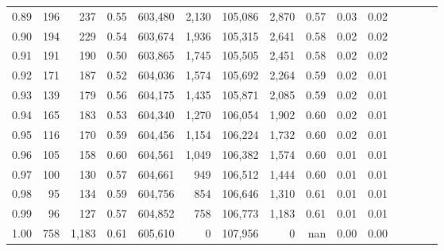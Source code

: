 \begin{tabular}{rrrcrrrrrrrrrrr}
0.89 &     196 &    237 &                                       0.55 &  603,480 &    2,130 &  105,086 &    2,870 &  0.57 &  0.03 &                         0.02 \\
0.90 &     194 &    229 &                                       0.54 &  603,674 &    1,936 &  105,315 &    2,641 &  0.58 &  0.02 &                         0.02 \\
0.91 &     191 &    190 &                                       0.50 &  603,865 &    1,745 &  105,505 &    2,451 &  0.58 &  0.02 &                         0.02 \\
0.92 &     171 &    187 &                                       0.52 &  604,036 &    1,574 &  105,692 &    2,264 &  0.59 &  0.02 &                         0.01 \\
0.93 &     139 &    179 &                                       0.56 &  604,175 &    1,435 &  105,871 &    2,085 &  0.59 &  0.02 &                         0.01 \\
0.94 &     165 &    183 &                                       0.53 &  604,340 &    1,270 &  106,054 &    1,902 &  0.60 &  0.02 &                         0.01 \\
0.95 &     116 &    170 &                                       0.59 &  604,456 &    1,154 &  106,224 &    1,732 &  0.60 &  0.02 &                         0.01 \\
0.96 &     105 &    158 &                                       0.60 &  604,561 &    1,049 &  106,382 &    1,574 &  0.60 &  0.01 &                         0.01 \\
0.97 &     100 &    130 &                                       0.57 &  604,661 &      949 &  106,512 &    1,444 &  0.60 &  0.01 &                         0.01 \\
0.98 &      95 &    134 &                                       0.59 &  604,756 &      854 &  106,646 &    1,310 &  0.61 &  0.01 &                         0.01 \\
0.99 &      96 &    127 &                                       0.57 &  604,852 &      758 &  106,773 &    1,183 &  0.61 &  0.01 &                         0.01 \\
1.00 &     758 &  1,183 &                                       0.61 &  605,610 &        0 &  107,956 &        0 &   nan &  0.00 &                         0.00 \\
\bottomrule
\end{tabular}
